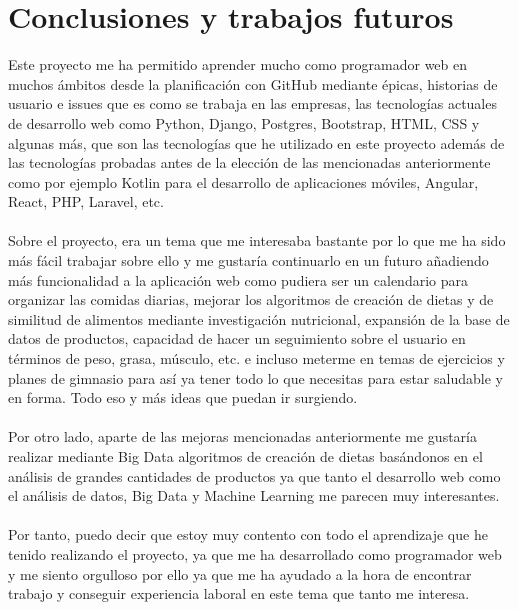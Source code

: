 \chapter{Conclusiones y trabajos futuros} \label{sec:conclusion}


Este proyecto me ha permitido aprender mucho como programador web en muchos ámbitos desde
la planificación con GitHub mediante épicas, historias de usuario e issues que es como se 
trabaja en las empresas, las tecnologías actuales de desarrollo web como Python, Django, 
Postgres, Bootstrap, HTML, CSS y algunas más, que son las tecnologías que he utilizado en 
este proyecto además de las tecnologías probadas antes de la elección de las mencionadas 
anteriormente como por ejemplo Kotlin para el desarrollo de aplicaciones móviles, Angular, 
React, PHP, Laravel, etc.
\\\\
Sobre el proyecto, era un tema que me interesaba bastante por lo que me ha sido más fácil 
trabajar sobre ello y me gustaría continuarlo en un futuro añadiendo más funcionalidad a 
la aplicación web como pudiera ser un calendario para organizar las comidas diarias, mejorar 
los algoritmos de creación de dietas y de similitud de alimentos mediante investigación 
nutricional, expansión de la base de datos de productos, capacidad de hacer un seguimiento
sobre el usuario en términos de peso, grasa, músculo, etc. e incluso meterme en temas de 
ejercicios y planes de gimnasio para así ya tener todo lo que necesitas para estar saludable 
y en forma. Todo eso y más ideas que puedan ir surgiendo.
\\\\
Por otro lado, aparte de las mejoras mencionadas anteriormente me gustaría realizar mediante
Big Data algoritmos de creación de dietas basándonos en el análisis de grandes cantidades de
productos ya que tanto el desarrollo web como el análisis de datos, Big Data y Machine Learning
me parecen muy interesantes.
\\\\
Por tanto, puedo decir que estoy muy contento con todo el aprendizaje que he tenido realizando 
el proyecto, ya que me ha desarrollado como programador web y me siento orgulloso por ello ya 
que me ha ayudado a la hora de encontrar trabajo y conseguir experiencia laboral en este tema 
que tanto me interesa.